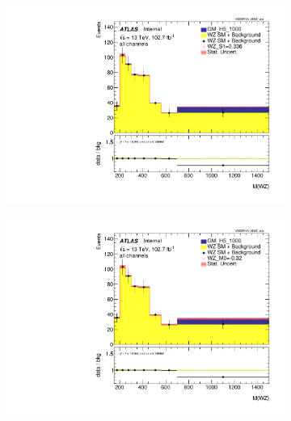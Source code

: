 \documentclass[../Bachelorarbeit.tex]{subfiles}
\begin{document}
\begin{figure}[h]

    \centering
    \begin{subfigure}{0.45\textwidth}
        \includegraphics[width=\textwidth]{Plots/ALL_MWZ_right_color/GM_H5_1000/S1/2022-05-07/VBSSR/all_VV_MWZ_vbs.pdf}
    \end{subfigure}
    \begin{subfigure}{0.45\textwidth}
        \includegraphics[width=\textwidth]{Plots/ALL_MWZ_right_color/GM_H5_1000/M0/2022-05-07/VBSSR/all_VV_MWZ_vbs.pdf}
    \end{subfigure}
    \begin{subfigure}{0.45\textwidth}

\end{subfigure}
\end{figure}
\end{document}
